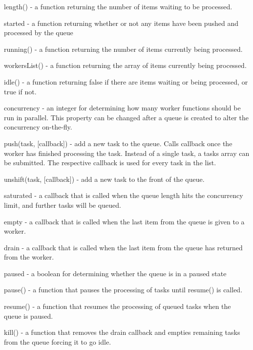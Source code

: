 \begin{DoxyItemize}
\item {\ttfamily length()} -\/ a function returning the number of items waiting to be processed.
\item {\ttfamily started} -\/ a function returning whether or not any items have been pushed and processed by the queue
\item {\ttfamily running()} -\/ a function returning the number of items currently being processed.
\item {\ttfamily workers\+List()} -\/ a function returning the array of items currently being processed.
\item {\ttfamily idle()} -\/ a function returning false if there are items waiting or being processed, or true if not.
\item {\ttfamily concurrency} -\/ an integer for determining how many {\ttfamily worker} functions should be run in parallel. This property can be changed after a {\ttfamily queue} is created to alter the concurrency on-\/the-\/fly.
\item {\ttfamily push(task, \mbox{[}callback\mbox{]})} -\/ add a new task to the {\ttfamily queue}. Calls {\ttfamily callback} once the {\ttfamily worker} has finished processing the task. Instead of a single task, a {\ttfamily tasks} array can be submitted. The respective callback is used for every task in the list.
\item {\ttfamily unshift(task, \mbox{[}callback\mbox{]})} -\/ add a new task to the front of the {\ttfamily queue}.
\item {\ttfamily saturated} -\/ a callback that is called when the {\ttfamily queue} length hits the {\ttfamily concurrency} limit, and further tasks will be queued.
\item {\ttfamily empty} -\/ a callback that is called when the last item from the {\ttfamily queue} is given to a {\ttfamily worker}.
\item {\ttfamily drain} -\/ a callback that is called when the last item from the {\ttfamily queue} has returned from the {\ttfamily worker}.
\item {\ttfamily paused} -\/ a boolean for determining whether the queue is in a paused state
\item {\ttfamily pause()} -\/ a function that pauses the processing of tasks until {\ttfamily resume()} is called.
\item {\ttfamily resume()} -\/ a function that resumes the processing of queued tasks when the queue is paused.
\item {\ttfamily kill()} -\/ a function that removes the {\ttfamily drain} callback and empties remaining tasks from the queue forcing it to go idle.
\end{DoxyItemize}

